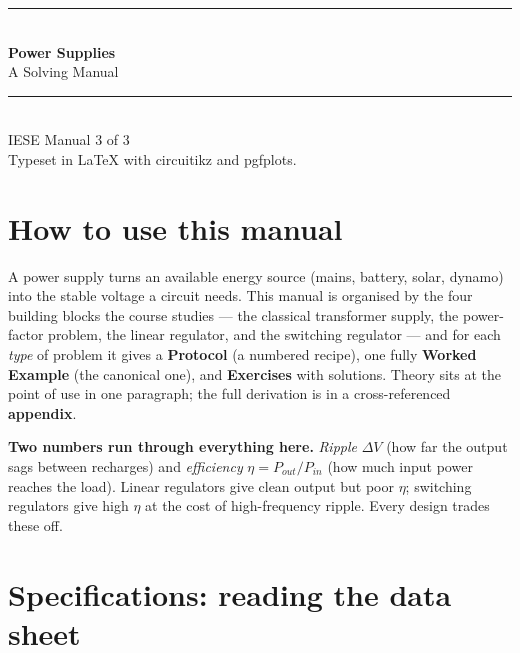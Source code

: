 \documentclass[11pt,a4paper,oneside]{book}
\begin{document}
\frontmatter

\begingroup
\thispagestyle{empty}\centering
\vspace*{2.2cm}
{\color{accent}\rule{\linewidth}{1.4pt}}\\[0.5cm]
{\Huge\bfseries\color{accent} Power Supplies}\\[0.35cm]
{\LARGE A Solving Manual}\\[0.4cm]
{\color{accent}\rule{\linewidth}{1.4pt}}\\[1.2cm]
{\large IESE Manual 3 of 3}\\[1.6cm]
{\footnotesize Typeset in \LaTeX{} with circuitikz and pgfplots.}
\par\vspace*{\fill}
\endgroup
\clearpage

\chapter*{How to use this manual}

A power supply turns an available energy source (mains, battery, solar, dynamo)
into the stable voltage a circuit needs. This manual is organised by the four
building blocks the course studies --- the classical transformer supply, the
power-factor problem, the linear regulator, and the switching regulator --- and
for each \emph{type} of problem it gives a \textbf{Protocol} (a numbered
recipe), one fully \textbf{Worked Example} (the canonical one),
and \textbf{Exercises} with solutions. Theory sits at the point of use in one
paragraph; the full derivation is in a cross-referenced \textbf{appendix}.

\begin{keyidea}
\textbf{Two numbers run through everything here.} \emph{Ripple} $\Delta V$ (how
far the output sags between recharges) and \emph{efficiency}
$\eta=P_{out}/P_{in}$ (how much input power reaches the load). Linear regulators
give clean output but poor $\eta$; switching regulators give high $\eta$ at the
cost of high-frequency ripple. Every design trades these off.
\end{keyidea}

\tableofcontents
\clearpage
\mainmatter

\chapter{Specifications: reading the data sheet}\label{ch:spec}
\end{document}
